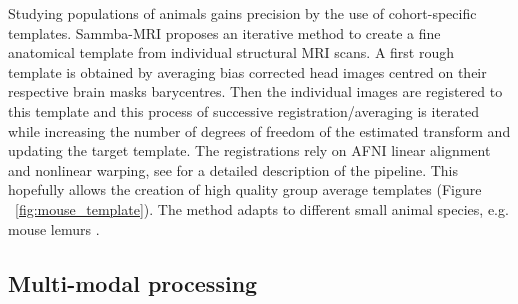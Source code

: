 \documentclass[utf8, a4paper, final, crop]{frontiersSCNS} %
\begin{document}
Studying populations of animals gains precision by the use of cohort-specific 
templates. Sammba-MRI proposes an iterative method to create a fine anatomical 
template from individual structural MRI scans. A first rough template is obtained
by averaging bias corrected head images centred on their respective brain masks barycentres. Then the individual images are registered to this template
and this process of successive registration/averaging is iterated while increasing the number of degrees of 
freedom of the estimated transform and updating the target template. The registrations rely on AFNI linear 
alignment and nonlinear warping, see \citep{nadkarni20193d} for a detailed description of the pipeline. This hopefully allows the creation of high quality
group average templates (Figure ~\ref{fig:mouse_template}). The method adapts to different small animal species, e.g. mouse lemurs %
\citep{nadkarni2018digital}.

\subsection{Multi-modal processing}
\end{document}
